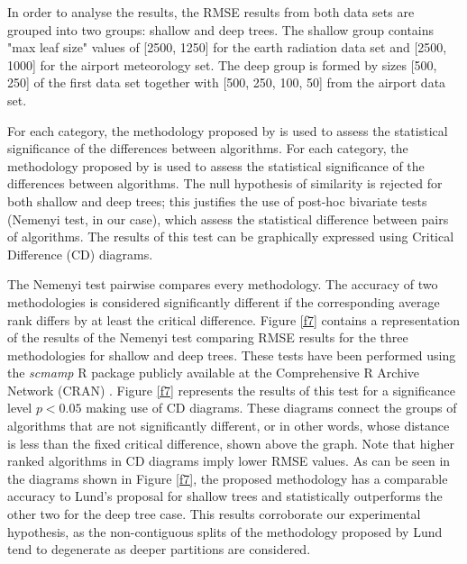 \documentclass[times,twocolumn,final,authoryear]{elsarticle}
\begin{document}
In order to analyse the results, the RMSE results from both data sets are grouped into two groups: shallow and deep trees. The shallow group contains "max leaf size" values of [2500, 1250] for the earth radiation data set and [2500, 1000] for the airport meteorology set. The deep group is formed by sizes [500, 250] of the first data set together with [500, 250, 100, 50] from the airport data set.

For each category, the methodology proposed by \citep{Demsar2006} is used to assess the statistical significance of the differences between algorithms. For each category, the methodology proposed by \citep{Demsar2006} is used to assess the statistical significance of the differences between algorithms. The null hypothesis of similarity is rejected for both shallow and deep trees; this justifies the use of post-hoc bivariate tests (Nemenyi test, in our case), which assess the statistical difference between pairs of algorithms. The results of this test can be graphically expressed using Critical Difference (CD) diagrams.

The Nemenyi test pairwise compares every methodology. The accuracy of two methodologies is considered significantly different if the corresponding average rank differs by at least the critical difference. Figure \ref{f7} contains a representation of the results of the Nemenyi test comparing RMSE results for the three methodologies for shallow and deep trees. These tests have been performed using the \textit{scmamp} R package publicly available at the Comprehensive R Archive Network (CRAN) \citep{Calvo2015}. Figure \ref{f7} represents the results of this test for a significance level $ p < 0.05 $ making use of CD diagrams.  These diagrams connect the groups of algorithms that are not significantly different, or in other words, whose distance is less than the fixed critical difference, shown above the graph. Note that higher ranked algorithms in CD diagrams imply lower RMSE values. As can be seen in the diagrams shown in Figure \ref{f7}, the proposed methodology has a comparable accuracy to Lund's proposal for shallow trees and statistically outperforms the other two for the deep tree case. This results corroborate our experimental hypothesis, as the non-contiguous splits of the methodology proposed by Lund tend to degenerate as deeper partitions are considered.
\end{document}
